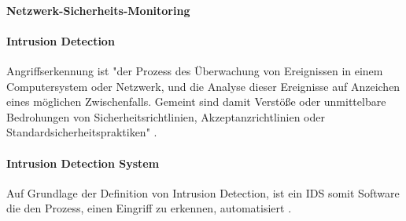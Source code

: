 \paragraph{Netzwerk-Sicherheits-Monitoring}
\paragraph{Intrusion Detection}
Angriffserkennung ist "der Prozess des Überwachung von Ereignissen in einem Computersystem oder Netzwerk, und die Analyse dieser Ereignisse auf Anzeichen eines möglichen Zwischenfalls. Gemeint sind damit Verstöße oder unmittelbare Bedrohungen von Sicherheitsrichtlinien, Akzeptanzrichtlinien oder Standardsicherheitspraktiken" \cite{scarfone2007guide}. 

\paragraph{Intrusion Detection System}
Auf Grundlage der Definition von Intrusion Detection, ist ein IDS somit Software die den Prozess, einen Eingriff zu erkennen, automatisiert \cite{scarfone2007guide}. 





